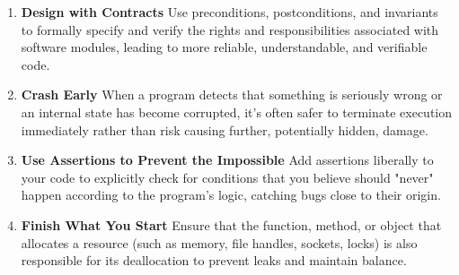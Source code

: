 \documentclass[11pt]{article}
\begin{document}
\begin{enumerate}[label=\arabic*., start=29, itemsep=1ex]
    \item \textbf{Design with Contracts}
    Use preconditions, postconditions, and invariants to formally specify and verify the rights and responsibilities associated with software modules, leading to more reliable, understandable, and verifiable code.

    \item \textbf{Crash Early}
    When a program detects that something is seriously wrong or an internal state has become corrupted, it's often safer to terminate execution immediately rather than risk causing further, potentially hidden, damage.

    \item \textbf{Use Assertions to Prevent the Impossible}
    Add assertions liberally to your code to explicitly check for conditions that you believe should "never" happen according to the program's logic, catching bugs close to their origin.

    \item \textbf{Finish What You Start}
    Ensure that the function, method, or object that allocates a resource (such as memory, file handles, sockets, locks) is also responsible for its deallocation to prevent leaks and maintain balance.
\end{enumerate}

\newpage
\end{document}
